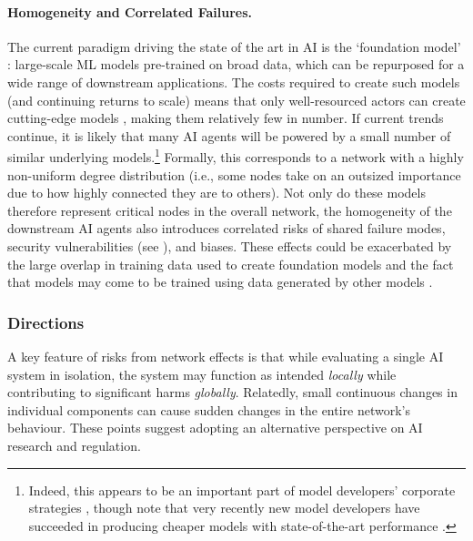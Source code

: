 \paragraph{Homogeneity and Correlated Failures.}
The current paradigm driving the state of the art in AI is the `foundation model' \citep{Bommasani2021-dy}: large-scale ML models pre-trained on broad data, which can be repurposed for a wide range of downstream applications.
The costs required to create such models (and continuing returns to scale) means that only well-resourced actors can create cutting-edge models \citep{kaplan_scaling_2020,hoffmann_training_2022,epoch_ml_2023}, making them relatively few in number.
If current trends continue, it is likely that many AI agents will be powered by a small number of similar underlying models.\footnote{Indeed, this appears to be an important part of model developers' corporate strategies \citep{GDM_agents,Anthropic_agents,OpenAI_agents,Meta_agents,Microsoft_agents}, though note that very recently new model developers have succeeded in producing cheaper models with state-of-the-art performance \citep[see, e.g.,][]{DeepSeekAI2025}.}
Formally, this corresponds to a network with a highly non-uniform degree distribution (i.e., some nodes take on an outsized importance due to how highly connected they are to others).
Not only do these models therefore represent critical nodes in the overall network, the homogeneity of the downstream AI agents also introduces correlated risks of shared failure modes, security vulnerabilities (see ), and biases.
These effects could be exacerbated by the large overlap in training data used to create foundation models \citep{Chen2024OnCI,Gao2020ThePA} and the fact that models may come to be trained using data generated by other models \citep[see also ]{Shumailov2024AIMC,Martnez2023TowardsUT,alemohammad_self-consuming_2023}.








\subsubsection{Directions}

A key feature of risks from network effects is that while evaluating a single AI system in isolation, the system may function as intended \emph{locally} while contributing to significant harms \emph{globally}.
Relatedly, small continuous changes in individual components can cause sudden changes in the entire network's behaviour.
These points suggest adopting an alternative perspective on AI research and regulation.

